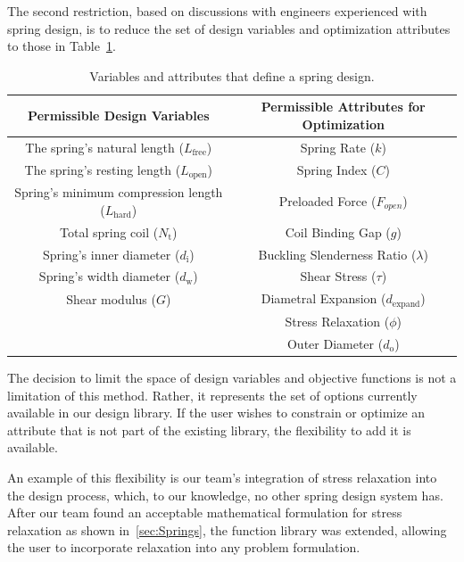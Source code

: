 \documentclass[10pt]{article}
\begin{document}
The second restriction, based on discussions with engineers experienced with spring design, is to reduce the set of design variables and optimization attributes to those in Table~\ref{tab:Design}.
\begin{table}
\caption{Variables and attributes that define a spring design.}
	\centering
	 \begin{tabular}{ c  c }
	 \hline\hline
	 Permissible Design Variables & Permissible Attributes for Optimization \\
	 \hline
     	The spring's natural length ($L_{\text{free}}$) 					& Spring Rate ($k$) \\
	    The spring's resting length ($L_{\text{open}}$) 				& Spring Index ($C$)  \\
		Spring's minimum compression length  ($L_{\text{hard}}$) 	& Preloaded Force ($F_{open}$) \\
		Total spring coil ($N_{\text{t}}$)    						& Coil Binding Gap ($g$) \\
		Spring's inner diameter ($d_{\text{i}}$)    					& Buckling Slenderness Ratio ($\lambda$) \\
		Spring's width diameter ($d_{\text{w}}$)    					& Shear Stress ($\tau$) \\
		Shear modulus  ($G$)        							& Diametral Expansion ($d_{\text{expand}}$) \\
														& Stress Relaxation ($\phi$) \\
														& Outer Diameter ($d_{\text{o}}$) \\
\hline\hline
	 \end{tabular}
	 \label{tab:Design}
\end{table}
The decision to limit the space of design variables and objective functions is not a limitation of this method.  Rather, it represents the set of options currently available in our design library.  If the user wishes to constrain or optimize an attribute that is not part of the existing library, the flexibility to add it is available.

An example of this flexibility is our team's integration of stress relaxation into the design process, which, to our knowledge, no other spring design system has. After our team found an acceptable mathematical formulation for stress relaxation as shown in~\ref{sec:Springs}, the function library was extended, allowing the user to incorporate relaxation into any problem formulation.
\end{document}
